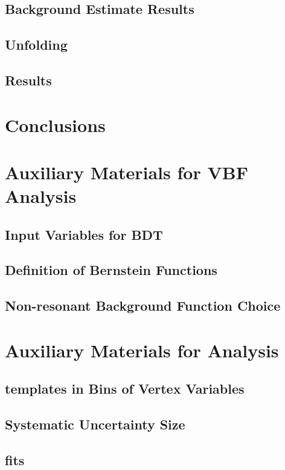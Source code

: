 \documentclass{report}
\begin{document}
\section{Background Estimate Results}

\clearpage

\section{Unfolding}
\label{sec:gbb-unfolding}

\clearpage

\section{Results}
\label{sec:gbb-results}

\clearpage

\chapter{Conclusions}
\clearpage

\appendix
\chapter{Auxiliary Materials for VBF \Hbb Analysis}
\section{Input Variables for BDT}

\section{Definition of Bernstein Functions}

\section{Non-resonant Background Function Choice}


\chapter{Auxiliary Materials for \gbb Analysis}
\section{\subsdzero templates in Bins of Vertex Variables}

\clearpage
\section{Systematic Uncertainty Size}

\clearpage
\section{\subsdzero fits}




\end{document}
